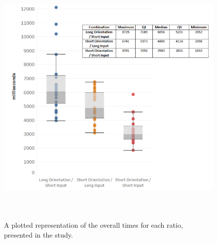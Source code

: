 \begin{figure}[t!]
\centering
\includegraphics[width=15cm, height=13cm]{Chapters/graphics/Combinations.png}
\caption{A plotted representation of the overall times for each ratio, presented in the study.}
\label{fig:combination}
\end{figure}

